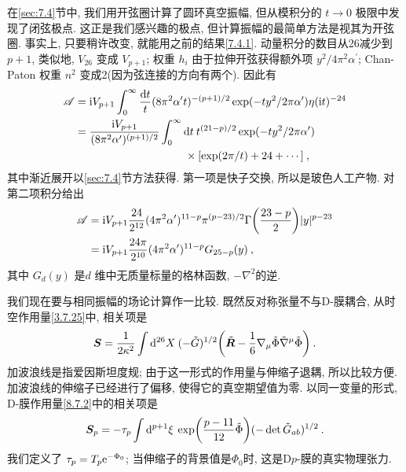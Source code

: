在\ref{sec:7.4}节中, 我们用开弦圈计算了圆环真空振幅, 但从模积分的 $t \rightarrow 0$ 极限中发现了闭弦极点. 
这正是我们感兴趣的极点, 但计算振幅的最简单方法是视其为开弦圈. 事实上, 只要稍许改变, 就能用之前的结果\eqref{7.4.1}. 
动量积分的数目从26减少到$p{+}1$, 类似地, $V_{26}$ 变成 $V_{p+1}$; 权重 $h_{i}$ 由于拉伸开弦获得额外项 $y^{2} / 4\pi^{2} \alpha^{\prime}$; 
Chan-Paton 权重 $n^{2}$ 变成2(因为弦连接的方向有两个). 因此有
\begin{align}
	\mathscr{A} &= \mathrm{i} V_{p+1} \int_{0}^{\infty} \frac{\mathrm{d} t}{t} (8 \pi^{2} \alpha^{\prime} t)^{-(p+1)/2} 
				   \exp (-t y^{2} / 2 \pi \alpha^{\prime}) \eta(\mathrm{i} t)^{-24}  \nonumber \\
				&= \frac{\mathrm{i} V_{p+1}}{(8 \pi^{2} \alpha^{\prime})^{(p+1)/2}} 
				   \int_{0}^{\infty} \mathrm{d} t\: t^{(21-p)/2} \exp (-t y^{2} / 2 \pi \alpha^{\prime}) \nonumber \\
				& \qquad \qquad \qquad \qquad \qquad  \times[\exp (2 \pi/t)+24+\cdots] \:, \label{8.7.17}
\end{align}
其中渐近展开以\ref{sec:7.4}节方法获得. 第一项是快子交换, 所以是玻色人工产物. 对第二项积分给出
\begin{align}
	\mathscr{A} &= \mathrm{i} V_{p+1} \frac{24}{2^{12}}(4 \pi^{2} \alpha^{\prime})^{11-p} \pi^{(p-23)/2} 
				   \Gamma\biggl(\frac{23-p}{2}\biggr)|y|^{p-23}  \nonumber \\
				&= \mathrm{i} V_{p+1} \frac{24 \pi}{2^{10}}(4 \pi^{2} \alpha^{\prime})^{11-p} G_{25-p}(y) \:, \label{8.7.18}
\end{align}
其中 $G_{d}(y)$ 是$d$ 维中无质量标量的格林函数, $-\nabla^{2}$的逆.

我们现在要与相同振幅的场论计算作一比较. 既然反对称张量不与D-膜耦合, 从时空作用量\eqref{3.7.25}中, 相关项是
\begin{equation}
	\bm{S}=\frac{1}{2 \kappa^{2}} \int \mathrm{d}^{26} X \: (-\tilde{G})^{1/2} 
		   \biggl(\tilde{\bm{R}}-\frac{1}{6} \nabla_{\mu} \tilde{\Phi} \tilde{\nabla}^{\mu} \tilde{\Phi}\biggr) \:. \label{8.7.19}
\end{equation}
加波浪线是指爱因斯坦度规; 由于这一形式的作用量与伸缩子退耦, 所以比较方便. 加波浪线的伸缩子已经进行了偏移, 使得它的真空期望值为零. 
以同一变量的形式, D-膜作用量\eqref{8.7.2}中的相关项是
\begin{equation}
	\bm{S}_{p} = -\tau_{p} \int \mathrm{d}^{p+1} \xi \: \exp \biggl(\frac{p-11}{12} \tilde{\Phi}\biggr)
				 (-\operatorname{det} \tilde{G}_{ab})^{1/2} \:. \label{8.7.20}
\end{equation}
我们定义了 $\tau_{p}=T_{p} \mathrm{e}^{-\Phi_{0}}$; 当伸缩子的背景值是$\Phi_{0}$时, 这是D$p$-膜的真实物理张力.

